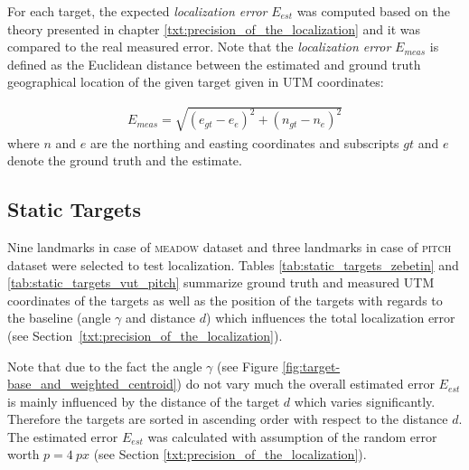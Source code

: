 For each target, the expected \textit{localization error} $E_{est}$ was computed based on the theory presented in chapter \ref{txt:precision_of_the_localization} and it was compared to the real measured error. Note that the \textit{localization error} $E_{meas}$ is defined as the Euclidean distance between the estimated and ground truth geographical location of the given target given in UTM coordinates:

\begin{align}
	E_{meas} = \sqrt{(e_{gt} - e_{e})^{2} + (n_{gt} - n_{e})^{2}}
\end{align}
where $n$ and $e$ are the northing and easting coordinates and subscripts $gt$ and $e$ denote the ground truth and the estimate.

\subsection{Static Targets}

Nine landmarks in case of \textsc{meadow} dataset and three landmarks in case of \textsc{pitch} dataset were selected to test localization. Tables \ref{tab:static_targets_zebetin} and \ref{tab:static_targets_vut_pitch} summarize ground truth and measured UTM coordinates of the targets as well as the position of the targets with regards to the baseline (angle $\gamma$ and distance $d$) which influences the total localization error (see Section~\ref{txt:precision_of_the_localization}). 

Note that due to the fact the angle $\gamma$ (see Figure \ref{fig:target-base_and_weighted_centroid}) do not vary much the overall estimated error $E_{est}$ is mainly influenced by the distance of the target $d$ which varies significantly. Therefore the targets are sorted in ascending order with respect to the distance $d$. The estimated error $E_{est}$ was calculated with assumption of the random error worth $p = 4~px$ (see Section \ref{txt:precision_of_the_localization}). 

